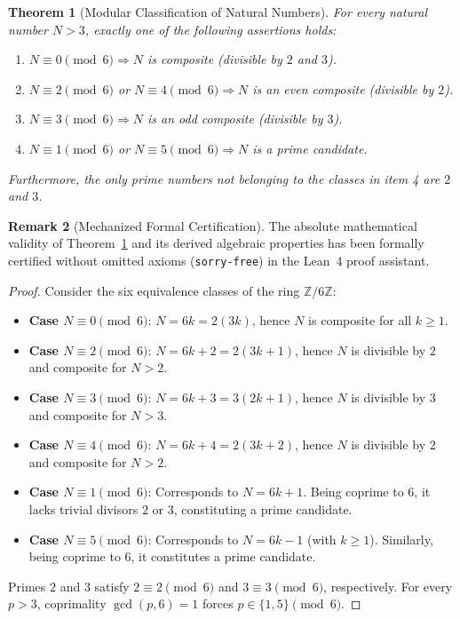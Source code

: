 \documentclass{article}
\numberwithin{equation}{section}
\newcommand{\ZZ}{\mathbb{Z}}
\theoremstyle{plain}
\newtheorem{theorem}{Theorem}[section]
\theoremstyle{definition}
\newtheorem{remark}[theorem]{Remark}
\begin{document}
\begin{theorem}[Modular Classification of Natural Numbers]
\label{thm:clasificacion-modular}
For every natural number $N > 3$, exactly one of the following assertions holds:
\begin{enumerate}
    \item $N \equiv 0 \pmod{6} \Rightarrow N$ is composite (divisible by $2$ and $3$).
    \item $N \equiv 2 \pmod{6}$ or $N \equiv 4 \pmod{6} \Rightarrow N$ is an even composite (divisible by $2$).
    \item $N \equiv 3 \pmod{6} \Rightarrow N$ is an odd composite (divisible by $3$).
    \item $N \equiv 1 \pmod{6}$ or $N \equiv 5 \pmod{6} \Rightarrow N$ is a prime candidate.
\end{enumerate}
Furthermore, the only prime numbers not belonging to the classes in item 4 are $2$ and $3$.
\end{theorem}

\begin{remark}[Mechanized Formal Certification]
The absolute mathematical validity of Theorem~\ref{thm:clasificacion-modular} and its derived algebraic properties has been formally certified without omitted axioms (\texttt{sorry-free}) in the Lean~4 proof assistant.
\end{remark}

\begin{proof}
Consider the six equivalence classes of the ring $\ZZ/6\ZZ$:
\begin{itemize}
    \item \textbf{Case $N \equiv 0 \pmod{6}$}: $N = 6k = 2(3k)$, hence $N$ is composite for all $k \ge 1$.
    \item \textbf{Case $N \equiv 2 \pmod{6}$}: $N = 6k + 2 = 2(3k + 1)$, hence $N$ is divisible by $2$ and composite for $N > 2$.
    \item \textbf{Case $N \equiv 3 \pmod{6}$}: $N = 6k + 3 = 3(2k + 1)$, hence $N$ is divisible by $3$ and composite for $N > 3$.
    \item \textbf{Case $N \equiv 4 \pmod{6}$}: $N = 6k + 4 = 2(3k + 2)$, hence $N$ is divisible by $2$ and composite for $N > 2$.
    \item \textbf{Case $N \equiv 1 \pmod{6}$}: Corresponds to $N = 6k + 1$. Being coprime to $6$, it lacks trivial divisors $2$ or $3$, constituting a prime candidate.
    \item \textbf{Case $N \equiv 5 \pmod{6}$}: Corresponds to $N = 6k - 1$ (with $k \ge 1$). Similarly, being coprime to $6$, it constitutes a prime candidate.
\end{itemize}
Primes $2$ and $3$ satisfy $2 \equiv 2 \pmod{6}$ and $3 \equiv 3 \pmod{6}$, respectively. For every $p > 3$, coprimality $\gcd(p, 6) = 1$ forces $p \in \{1, 5\} \pmod{6}$.
\end{proof}
\end{document}
